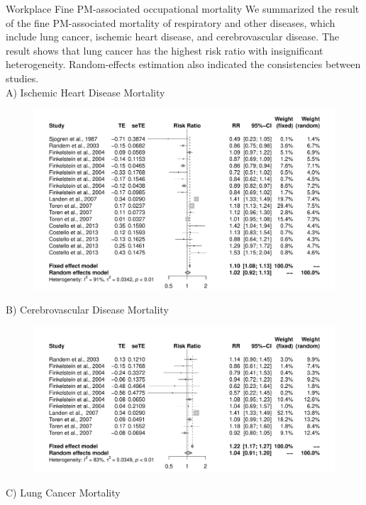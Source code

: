 \documentclass[final,t]{beamer}
\begin{document}
\begin{frame}[fragile]
\begin{columns}[t]
    \begin{column}{0.36\linewidth}
      \begin{block}{Workplace Fine PM-associated occupational mortality}
      We summarized the result of the fine PM-associated mortality of respiratory and other diseases, which include lung cancer, ischemic heart disease, and cerebrovascular disease. The result shows that lung cancer has the highest risk ratio with insignificant heterogeneity. Random-effects estimation also indicated the consistencies between studies.
      \vspace{5mm}
      \\
      {\large A) Ischemic Heart Disease Mortality}\\
      \begin{figure}[htb]
      \includegraphics[width=.95\columnwidth]{fig1}
      \end{figure}
      {\large B) Cerebrovascular Disease Mortality}\\
      \begin{figure}[htb]
      \includegraphics[width=.95\columnwidth]{fig2}
      \end{figure}
      {\large C) Lung Cancer Mortality}\\

\end{block}
\end{column}
\end{columns}
\end{frame}
\end{document}
